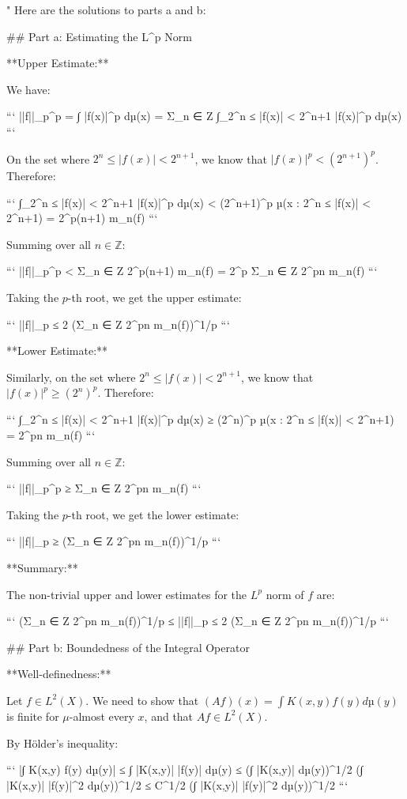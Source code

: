 "
Here are the solutions to parts a and b:

## Part a: Estimating the L^p Norm

**Upper Estimate:**

We have:

```
||f||_p^p = ∫ |f(x)|^p dµ(x)
       = Σ_{n ∈ Z} ∫_{2^n ≤ |f(x)| < 2^{n+1}} |f(x)|^p dµ(x)
```

On the set where $2^n \le |f(x)| < 2^{n+1}$, we know that $|f(x)|^p < (2^{n+1})^p$. Therefore:

```
∫_{2^n ≤ |f(x)| < 2^{n+1}} |f(x)|^p dµ(x) < (2^{n+1})^p µ({x : 2^n ≤ |f(x)| < 2^{n+1}})
                                                 = 2^{p(n+1)} m_n(f)
```

Summing over all $n \in \mathbb{Z}$:

```
||f||_p^p < Σ_{n ∈ Z} 2^{p(n+1)} m_n(f) = 2^p Σ_{n ∈ Z} 2^{pn} m_n(f)
```

Taking the $p$-th root, we get the upper estimate:

```
||f||_p ≤ 2 (Σ_{n ∈ Z} 2^{pn} m_n(f))^{1/p}
```

**Lower Estimate:**

Similarly, on the set where $2^n \le |f(x)| < 2^{n+1}$, we know that $|f(x)|^p \ge (2^n)^p$. Therefore:

```
∫_{2^n ≤ |f(x)| < 2^{n+1}} |f(x)|^p dµ(x) ≥ (2^n)^p µ({x : 2^n ≤ |f(x)| < 2^{n+1}})
                                                 = 2^{pn} m_n(f)
```

Summing over all $n \in \mathbb{Z}$:

```
||f||_p^p ≥ Σ_{n ∈ Z} 2^{pn} m_n(f)
```

Taking the $p$-th root, we get the lower estimate:

```
||f||_p ≥ (Σ_{n ∈ Z} 2^{pn} m_n(f))^{1/p}
```

**Summary:**

The non-trivial upper and lower estimates for the $L^p$ norm of $f$ are:

```
(Σ_{n ∈ Z} 2^{pn} m_n(f))^{1/p} ≤ ||f||_p ≤ 2 (Σ_{n ∈ Z} 2^{pn} m_n(f))^{1/p}
```

## Part b: Boundedness of the Integral Operator

**Well-definedness:**

Let $f \in L^2(X)$. We need to show that $(Af)(x) = \int K(x,y) f(y) dµ(y)$ is finite for $\mu$-almost every $x$, and that $Af \in L^2(X)$.

By Hölder's inequality:

```
|∫ K(x,y) f(y) dµ(y)| ≤ ∫ |K(x,y)| |f(y)| dµ(y)
                      ≤ (∫ |K(x,y)| dµ(y))^{1/2} (∫ |K(x,y)| |f(y)|^2 dµ(y))^{1/2}
                      ≤ C^{1/2} (∫ |K(x,y)| |f(y)|^2 dµ(y))^{1/2}
```

